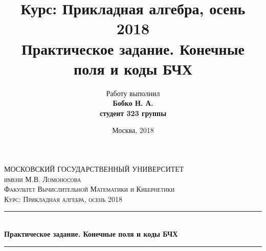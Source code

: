 \documentclass[12pt]{article}
\title{\textbf{Курс: Прикладная алгебра, осень 2018 \\
Практическое задание. Конечные поля и коды БЧХ \\}}
\author{Работу выполнил\\
\textbf{Бобко Н. А.} \\
\textbf{студент 323 группы}}
\date{Москва, 2018}
\begin{document}
    \begin{titlepage}

\newcommand{\HRule}{\rule{\linewidth}{0.5mm}} %

\center %
 

\textsc{\LARGE МОСКОВСКИЙ ГОСУДАРСТВЕННЫЙ УНИВЕРСИТЕТ}\\[1.5cm] %
\textsc{\Large имени М.В. Ломоносова}\\[0.5cm] %
\textsc{\large Факультет Вычислительной Математики и Кибернетики}\\[0.5cm] %
\textsc{\large Курс: Прикладная алгебра, осень 2018}\\[0.5cm] %


\HRule \\[0.4cm]
{ \huge \bfseries Практическое задание. Конечные поля и коды БЧХ}\\[0.4cm] %
\HRule \\[1.5cm]
 




\end{titlepage}
\end{document}
